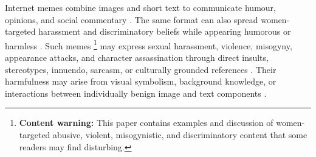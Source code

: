 \documentclass[11pt]{article}
\begin{document}
Internet memes combine images and short text to communicate humour,
opinions, and social commentary
\citep{hee2025demystifying,chen2025adammeme}. The same format can also
spread women-targeted harassment and discriminatory beliefs while
appearing humorous or harmless
\citep{lin2025explainhm++}. Such memes%
\footnote{\textbf{Content warning:} This paper contains examples and
discussion of women-targeted abusive, violent, misogynistic, and
discriminatory content that some readers may find disturbing.}
may express sexual harassment, violence, misogyny, appearance attacks,
and character assassination through direct insults, stereotypes,
innuendo, sarcasm, or culturally grounded references
\citep{kumari2025memedetoxnet}. Their harmfulness may arise from visual
symbolism, background knowledge, or interactions between individually
benign image and text components
\citep{kiela2020hateful,kumar2022hate,burbi2023mapping,
lin2023beneath}.
\end{document}
